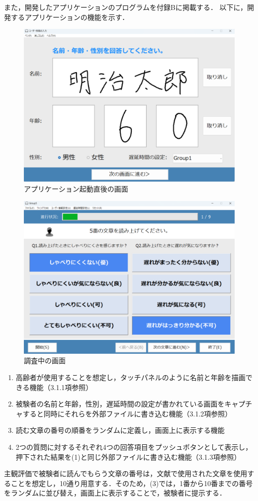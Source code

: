 また，開発したアプリケーションのプログラムを付録Bに掲載する．
以下に，開発するアプリケーションの機能を示す．
\begin{figure}[tbp]
  \centering
  \includegraphics[scale=0.4]{figures/Syukann/gamen_1.pdf}
  \caption{アプリケーション起動直後の画面}
  \label{fig:1_userInterface}
\end{figure}
\begin{figure}[tbp]
  \centering
  \includegraphics[scale=0.4]{figures/Syukann/app_2.pdf}
  \caption{調査中の画面}
  \label{fig:2_userInterface}
\end{figure}
\begin{enumerate}[leftmargin=*]
  \item 高齢者が使用することを想定し，タッチパネルのように名前と年齢を描画できる機能（3.1.1項参照）
  \item 被験者の名前と年齢，性別，遅延時間の設定が書かれている画面をキャプチャすると同時にそれらを外部ファイルに書き込む機能（3.1.2項参照）
  \item 読む文章の番号の順番をランダムに定義し，画面上に表示する機能
  \item 2つの質問に対するそれぞれ4つの回答項目をプッシュボタンとして表示し，押下された結果を(1)と同じ外部ファイルに書き込む機能（3.1.3項参照）
\end{enumerate}
主観評価で被験者に読んでもらう文章の番号は，文献\cite{kayama}で使用された文章を使用することを想定し，10通り用意する．そのため，(3)では，1番から10番までの番号をランダムに並び替え，画面上に表示することで，被験者に提示する．

